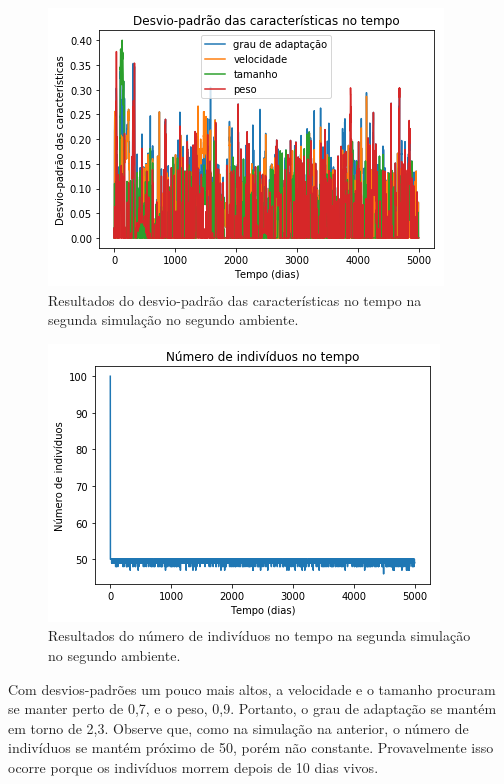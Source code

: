 \documentclass[10pt,brazil,english]{article}
\begin{document}
            \begin{figure}[!hbtp]
                \begin{center}
                    \includegraphics[scale=0.5]{Images/2-5.png}
                \end{center}
                \caption{Resultados do desvio-padrão das características no tempo na segunda simulação no segundo ambiente.}
                \label{Fig11}
            \end{figure} 
            
            \begin{figure}[!hbtp]
                \begin{center}
                    \includegraphics[scale=0.5]{Images/2-6.png}
                \end{center}
                \caption{Resultados do número de indivíduos no tempo na segunda simulação no segundo ambiente.}
                \label{Fig12}
            \end{figure}
            
            Com desvios-padrões um pouco mais altos, a velocidade e o tamanho procuram se manter perto de 0,7, e o peso, 0,9. Portanto, o grau de adaptação se mantém em torno de 2,3. Observe que, como na simulação na anterior, o número de indivíduos se mantém próximo de 50, porém não constante. Provavelmente isso ocorre porque os indivíduos morrem depois de 10 dias vivos.
            
\end{document}
